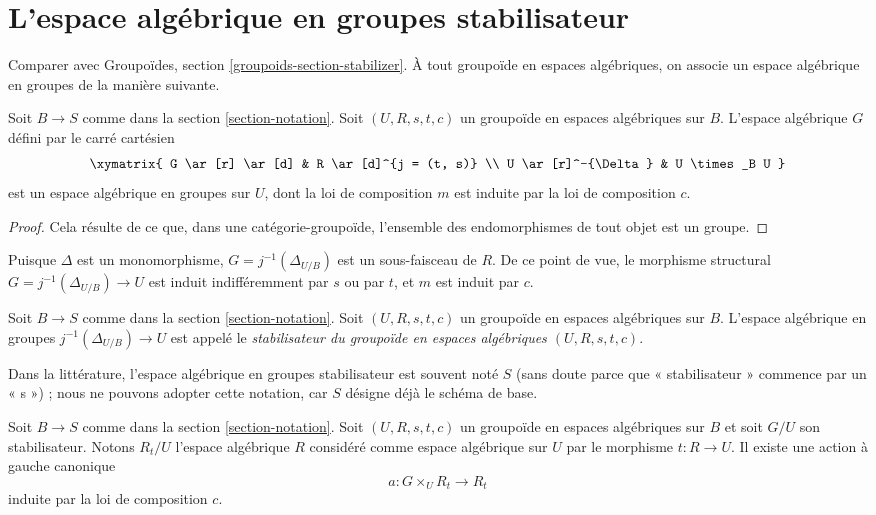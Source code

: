 \section{L'espace algébrique en groupes stabilisateur}
\label{section-stabilizer}

\noindent
Comparer avec Groupoïdes, section \ref{groupoids-section-stabilizer}. À tout groupoïde en espaces algébriques, on associe un espace algébrique en groupes de la manière suivante.

\begin{lemma}
\label{lemma-groupoid-stabilizer}
Soit $B \to S$ comme dans la section \ref{section-notation}. Soit $(U, R, s, t, c)$ un groupoïde en espaces algébriques sur $B$. L'espace algébrique $G$ défini par le carré cartésien
$$
\xymatrix{
G \ar[r] \ar[d] & R \ar[d]^{j = (t, s)} \\
U \ar[r]^-{\Delta} & U \times_B U
}
$$
est un espace algébrique en groupes sur $U$, dont la loi de composition $m$ est induite par la loi de composition $c$.
\end{lemma}

\begin{proof}
Cela résulte de ce que, dans une catégorie-groupoïde, l'ensemble des endomorphismes de tout objet est un groupe.
\end{proof}

\noindent
Puisque $\Delta$ est un monomorphisme, $G = j^{-1}(\Delta_{U/B})$ est un sous-faisceau de $R$. De ce point de vue, le morphisme structural $G = j^{-1}(\Delta_{U/B}) \to U$ est induit indifféremment par $s$ ou par $t$, et $m$ est induit par $c$.

\begin{definition}
\label{definition-stabilizer-groupoid}
Soit $B \to S$ comme dans la section \ref{section-notation}. Soit $(U, R, s, t, c)$ un groupoïde en espaces algébriques sur $B$. L'espace algébrique en groupes $j^{-1}(\Delta_{U/B}) \to U$ est appelé le {\it stabilisateur du groupoïde en espaces algébriques $(U, R, s, t, c)$}.
\end{definition}

\noindent
Dans la littérature, l'espace algébrique en groupes stabilisateur est souvent noté $S$ (sans doute parce que « stabilisateur » commence par un « s ») ; nous ne pouvons adopter cette notation, car $S$ désigne déjà le schéma de base.

\begin{lemma}
\label{lemma-groupoid-action-stabilizer}
Soit $B \to S$ comme dans la section \ref{section-notation}. Soit $(U, R, s, t, c)$ un groupoïde en espaces algébriques sur $B$ et soit $G/U$ son stabilisateur. Notons $R_t/U$ l'espace algébrique $R$ considéré comme espace algébrique sur $U$ par le morphisme $t : R \to U$. Il existe une action à gauche canonique
$$
a : G \times_U R_t \longrightarrow R_t
$$
induite par la loi de composition $c$.
\end{lemma}

